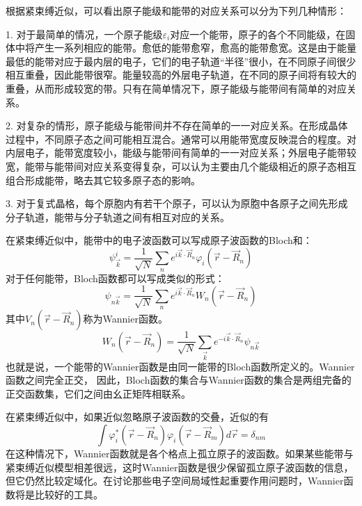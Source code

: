 根据紧束缚近似，可以看出原子能级和能带的对应关系可以分为下列几种情形：

1. 对于最简单的情况，一个原子能级$\varepsilon_i$对应一个能带，原子的各个不同能级，在固体中将产生一系列相应的能带。愈低的能带愈窄，愈高的能带愈宽。这是由于能量最低的能带对应于最内层的电子，它们的电子轨道“半径”很小，在不同原子间很少相互重叠，因此能带很窄。能量较高的外层电子轨道，在不同的原子间将有较大的重叠，从而形成较宽的带。只有在简单情况下，原子能级与能带间有简单的对应关系。

2. 对复杂的情形，原子能级与能带间并不存在简单的一一对应关系。在形成晶体过程中，不同原子态之间可能相互混合。通常可以用能带宽度反映混合的程度。对内层电子，能带宽度较小，能级与能带间有简单的一一对应关系；外层电子能带较宽，能带与能带间对应关系变得复杂，可以认为主要由几个能级相近的原子态相互组合形成能带，略去其它较多原子态的影响。

3. 对于复式晶格，每个原胞内有若干个原子，可以认为原胞中各原子之间先形成分子轨道，能带与分子轨道之间有相互对应的关系。

在紧束缚近似中，能带中的电子波函数可以写成原子波函数的Bloch和：
\begin{displaymath}
  \psi_{\vec k}^i=\dfrac1{\sqrt N}\sum_ne^{i\vec k\cdot\vec R_n}\varphi_i(\vec r-\vec R_n)
\end{displaymath}
对于任何能带，Bloch函数都可以写成类似的形式：
\begin{equation}
  \psi_{n\vec k}=\dfrac1{\sqrt N}\sum_ne^{i\vec k\cdot\vec R_n}W_n(\vec r-\vec R_n)
  \label{eq:solid-48}
\end{equation}
其中$V_n(\vec r-\vec R_n)$称为Wannier函数。
\begin{displaymath}
  W_n(\vec r-\vec R_n)=\dfrac1{\sqrt N}\sum_{\vec k}e^{-i\vec k\cdot\vec R_n}\psi_{n\vec k}
\end{displaymath}
也就是说，一个能带的Wannier函数是由同一能带的Bloch函数所定义的。Wannier函数之间完全正交，%
因此，Bloch函数的集合与Wannier函数的集合是两组完备的正交函数集，它们之间由幺正矩阵相联系。


在紧束缚近似中，如果近似忽略原子波函数的交叠，近似的有
\begin{displaymath}
  \int \varphi_i^{\ast}(\vec r-\vec R_n)\varphi_i(\vec r-\vec R_m)d\vec r=\delta_{nm}
\end{displaymath}
在这种情况下，Wannier函数就是各个格点上孤立原子的波函数。如果某些能带与紧束缚近似模型相差很远，这时Wannier函数是很少保留孤立原子波函数的信息，但它仍然比较定域化。在讨论那些电子空间局域性起重要作用问题时，Wannier函数将是比较好的工具。

